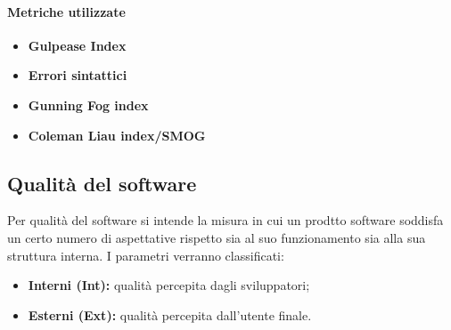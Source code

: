 \paragraph{Metriche utilizzate}
\begin{itemize}
	\item{\textbf{Gulpease Index}}
	\item{\textbf{Errori sintattici}}
	\item{\textbf{Gunning Fog index}}
	\item{\textbf{Coleman Liau index/SMOG}}
\end{itemize}
\begin{table}[!htpb]
\end{table}
\subsection{Qualità del software}
Per qualità del software si intende la misura in cui un prodtto software soddisfa un certo numero di aspettative rispetto sia al suo funzionamento sia alla sua struttura interna. I parametri verranno classificati:
\begin{itemize}
	\item{\textbf{Interni (Int):} qualità percepita dagli sviluppatori;}
	\item{\textbf{Esterni (Ext):} qualità percepita dall'utente finale.}
\end{itemize}
